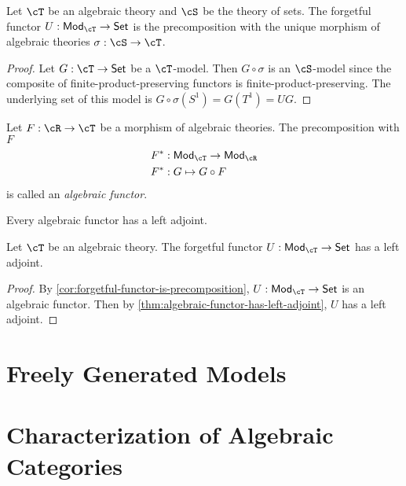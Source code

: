 \documentclass{amsart}
\begin{document}
\begin{cor}\label{cor:forgetful-functor-is-precomposition}
  Let $\cT$ be an algebraic theory and $\cS$ be the theory of sets.
  The forgetful functor $U : \mathsf{Mod}_{\cT} \to \mathsf{Set}$ is the precomposition with the unique morphism of algebraic theories $\sigma : \cS \to \cT$.
\end{cor}
\begin{proof}
  Let $G : \cT \to \mathsf{Set}$ be a $\cT$-model.
  Then $G \circ \sigma$ is an $\cS$-model since the composite of finite-product-preserving functors is finite-product-preserving.
  The underlying set of this model is $G \circ \sigma(S^{1}) = G(T^{1}) = UG$.
\end{proof}

\begin{defn}
  Let $F : \cR \to \cT$ be a morphism of algebraic theories.
  The precomposition with $F$
  \begin{align}
    F^{*} &: \mathsf{Mod}_{\cT} \to \mathsf{Mod}_{\cR}\\
    F^{*} &: G \mapsto G \circ F
  \end{align}
  is called an \emph{algebraic functor}.
\end{defn}

\begin{thm}\label{thm:algebraic-functor-has-left-adjoint}
  Every algebraic functor has a left adjoint.
\end{thm}

\begin{cor}
  Let $\cT$ be an algebraic theory.
  The forgetful functor $U : \mathsf{Mod}_{\cT} \to \mathsf{Set}$ has a left adjoint.
\end{cor}
\begin{proof}
  By \cref{cor:forgetful-functor-is-precomposition}, $U : \mathsf{Mod}_{\cT} \to \mathsf{Set}$ is an algebraic functor.
  Then by \cref{thm:algebraic-functor-has-left-adjoint}, $U$ has a left adjoint.
\end{proof}

\section{Freely Generated Models}
\label{sec:freely-generated-models}

\section{Characterization of Algebraic Categories}
\label{sec:characterization-of-algebraic-categories}
\end{document}

